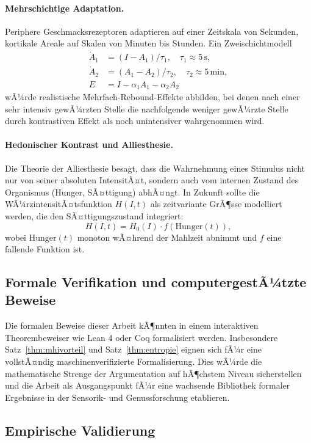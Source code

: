 ﻿\documentclass[12pt,a4paper]{article}
\theoremstyle{definition}
\begin{document}
\paragraph{Mehrschichtige Adaptation.}
Periphere Geschmacksrezeptoren adaptieren auf einer Zeitskala von
Sekunden, kortikale Areale auf Skalen von Minuten bis Stunden. Ein
Zweischichtmodell
\begin{align*}
  \dot{A}_1 &= (I - A_1)/\tau_1, \quad \tau_1 \approx 5\,\text{s}, \\
  \dot{A}_2 &= (A_1 - A_2)/\tau_2, \quad \tau_2 \approx 5\,\text{min}, \\
  E &= I - \alpha_1 A_1 - \alpha_2 A_2
\end{align*}
wÃ¼rde realistische Mehrfach-Rebound-Effekte abbilden, bei denen nach
einer sehr intensiv gewÃ¼rzten Stelle die nachfolgende weniger gewÃ¼rzte
Stelle durch kontrastiven Effekt als noch unintensiver wahrgenommen wird.

\paragraph{Hedonischer Kontrast und Alliesthesie.}
Die Theorie der Alliesthesie \cite{cabanac1971} besagt, dass die
Wahrnehmung eines Stimulus nicht nur von seiner absoluten IntensitÃ¤t,
sondern auch vom internen Zustand des Organismus (Hunger, SÃ¤ttigung)
abhÃ¤ngt. In Zukunft sollte die WÃ¼rzintensitÃ¤tsfunktion $H(I,t)$ als
zeitvariante GrÃ¶sse modelliert werden, die den SÃ¤ttigungszustand
integriert:
\[
  H(I, t) = H_0(I) \cdot f(\mathrm{Hunger}(t)),
\]
wobei $\mathrm{Hunger}(t)$ monoton wÃ¤hrend der Mahlzeit abnimmt und
$f$ eine fallende Funktion ist.

\subsection{Formale Verifikation und computergestÃ¼tzte Beweise}

Die formalen Beweise dieser Arbeit kÃ¶nnten in einem interaktiven
Theorembeweiser wie Lean 4 oder Coq formalisiert werden. Insbesondere
Satz~\ref{thm:mhivorteil} und Satz~\ref{thm:entropie} eignen sich
fÃ¼r eine vollstÃ¤ndig maschinenverifizierte Formalisierung. Dies wÃ¼rde
die mathematische Strenge der Argumentation auf hÃ¶chstem Niveau
sicherstellen und die Arbeit als Ausgangspunkt fÃ¼r eine wachsende
Bibliothek formaler Ergebnisse in der Sensorik- und Genussforschung
etablieren.

\subsection{Empirische Validierung}
\end{document}
